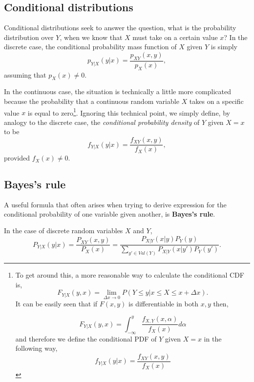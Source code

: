\documentclass{article}
\begin{document}
\subsection{Conditional distributions}

Conditional distributions seek to answer the question, what is the probability distribution over $Y$, when we know
that $X$ must take on a certain value $x$?
In the discrete case, the conditional probability mass
function of $X$ given $Y$ is simply
\begin{equation*}
  p_{Y|X}(y|x) = \frac{p_{XY}(x,y)}{p_X(x)},
\end{equation*}
assuming that $p_X(x) \neq 0$.

In the continuous case, the situation is technically a little more complicated
because the probability that a continuous random variable $X$ takes on a specific value $x$ is equal to zero\footnote{
  To get around this, a more reasonable way to calculate the
  conditional CDF is,
\begin{equation*}
F_{Y|X}(y,x)= \lim_{\Delta x \rightarrow 0} P(Y \leq y | x \leq X \leq x + \Delta x).
\end{equation*}
It can be easily seen that if $F(x,y)$ is differentiable in both $x,y$ then,

\begin{equation*}
F_{Y|X}(y,x)=\int_{-\infty}^{y} \frac{f_{X,Y}(x,\alpha)}{f_X(x)}d\alpha
\end{equation*}
and therefore we define the conditional PDF of $Y$ given $X=x$ in the following way,
\begin{equation*}
f_{Y|X}(y|x)= \frac{f_{XY}(x,y)}{f_X(x)}
\end{equation*}
}.  Ignoring this technical point, we simply define, by analogy to the discrete case,
the \emph{conditional probability density} of $Y$ given $X = x$ to be 
\begin{equation*}
  f_{Y|X}(y|x) = \frac{f_{XY}(x,y)}{f_X(x)},
\end{equation*}
provided $f_X(x) \neq 0$.

\subsection{Bayes's rule}
A useful formula that often arises when trying to derive expression for the conditional probability 
of one variable given another, is \textbf{Bayes's rule}.

In the case of discrete random variables $X$ and $Y$,
\begin{equation*}
P_{Y|X}(y|x)=\frac{P_{XY}(x,y)}{P_X(x)}=\frac{P_{X|Y}(x|y)P_Y(y)}{\sum_{y' \in Val(Y)} P_{X|Y}(x|y')P_Y(y')}.
\end{equation*}
\end{document}
